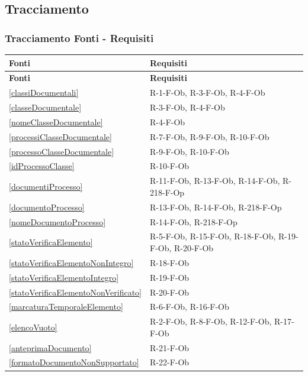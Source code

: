 \subsection{Tracciamento}

\subsubsection{Tracciamento Fonti - Requisiti}

\setlength{\LTleft}{\fill}
\setlength{\LTright}{\fill}
\begin{longtable}{|p{4cm}|p{10cm}|}
\hline
\rowcolor{zpusgreen!30}
\textbf{Fonti} & \textbf{Requisiti} \\
\hline
\endfirsthead
\rowcolor{zpusgreen!30}
\textbf{Fonti} & \textbf{Requisiti} \\
\hline
\endhead
\ref{classiDocumentali} & R-1-F-Ob, R-3-F-Ob, R-4-F-Ob \\
\hline
\ref{classeDocumentale} & R-3-F-Ob, R-4-F-Ob \\
\hline
\ref{nomeClasseDocumentale} & R-4-F-Ob \\
\hline
\ref{processiClasseDocumentale} & R-7-F-Ob, R-9-F-Ob, R-10-F-Ob \\
\hline
\ref{processoClasseDocumentale} & R-9-F-Ob, R-10-F-Ob \\
\hline
\ref{idProcessoClasse} & R-10-F-Ob \\
\hline
\ref{documentiProcesso} & R-11-F-Ob, R-13-F-Ob, R-14-F-Ob, R-218-F-Op \\
\hline
\ref{documentoProcesso} & R-13-F-Ob, R-14-F-Ob, R-218-F-Op \\
\hline
\ref{nomeDocumentoProcesso} & R-14-F-Ob, R-218-F-Op \\
\hline
\ref{statoVerificaElemento} & R-5-F-Ob, R-15-F-Ob, R-18-F-Ob, R-19-F-Ob, R-20-F-Ob \\
\hline
\ref{statoVerificaElementoNonIntegro} & R-18-F-Ob \\
\hline
\ref{statoVerificaElementoIntegro} & R-19-F-Ob \\
\hline
\ref{statoVerificaElementoNonVerificato} & R-20-F-Ob \\
\hline
\ref{marcaturaTemporaleElemento} & R-6-F-Ob, R-16-F-Ob \\
\hline
\ref{elencoVuoto} & R-2-F-Ob, R-8-F-Ob, R-12-F-Ob, R-17-F-Ob \\
\hline
\ref{anteprimaDocumento} & R-21-F-Ob \\
\hline
\ref{formatoDocumentoNonSupportato} & R-22-F-Ob \\

\end{longtable}
